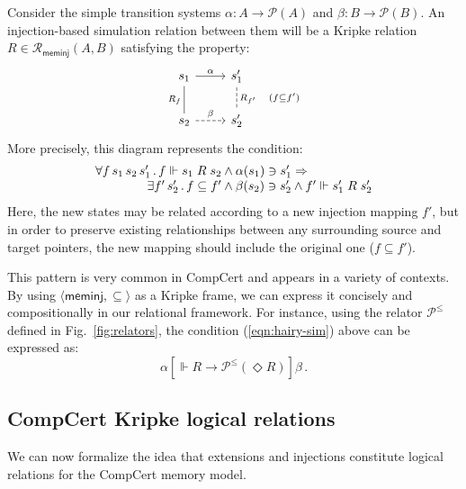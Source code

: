 \documentclass[sigplan,10pt,review,anonymous]{acmart}
\newcommand{\kw}[1]{\ensuremath{ \mathsf{#1} }}
\newcommand{\ifr}[1]{\mathrel{[{#1}]}}
\begin{document}
\begin{example} \label{ex:sim} %
Consider the simple transition systems
$\alpha : A \rightarrow \mathcal{P}(A)$ and
$\beta : B \rightarrow \mathcal{P}(B)$.
An injection-based simulation relation between them
will be a Kripke relation
$R \in \mathcal{R}_\kw{meminj}(A, B)$
satisfying the property:
\[
  \begin{tikzcd}
    s_1 \arrow[r, "\alpha"]
        \arrow[d, dash, "R_f"'] &
    s_1' \arrow[d, dashed, dash, "R_{f'} \quad (f \subseteq f')"] \\
    s_2 \arrow[r, dashed, "\beta"] &
    s_2'
  \end{tikzcd}
\]
More precisely, this diagram represents the condition:
\begin{equation}
    \label{eqn:hairy-sim}
    \begin{array}{r@{}l}
    \forall f \, s_1 \, s_2 \, s_1' \,.\,
      f \Vdash s_1 \mathrel{R} s_2 &{} \wedge
      \alpha(s_1) \ni s_1' \Rightarrow \\
    \exists f' \, s_2' \,.\,
      f \subseteq f' &{} \wedge
      \beta(s_2) \ni s_2' \wedge
      f' \Vdash s_1' \mathrel{R} s_2'
    \end{array}
\end{equation}
Here, the new states may be related according to
a new injection mapping $f'$,
but in order to preserve existing relationships
between any surrounding source and target pointers,
the new mapping should include
the original one ($f \subseteq f'$).

This pattern is very common in CompCert
and appears in a variety of contexts.
By using $\langle \kw{meminj}, {\subseteq} \rangle$
as a Kripke frame,
we can express it concisely and compositionally
in our relational framework.
For instance,
using the relator $\mathcal{P}^\le$ defined in
Fig.~\ref{fig:relators},
the condition (\ref{eqn:hairy-sim}) above can be expressed
as:
\[
  \alpha \ifr{\Vdash R \rightarrow \mathcal{P}^\le(\Diamond R)} \beta \,.
\]
\end{example}


\subsection{CompCert Kripke logical relations} \label{sec:cklrdef} %

We can now formalize the idea that
extensions and injections
constitute logical relations for the CompCert memory model.
\end{document}
